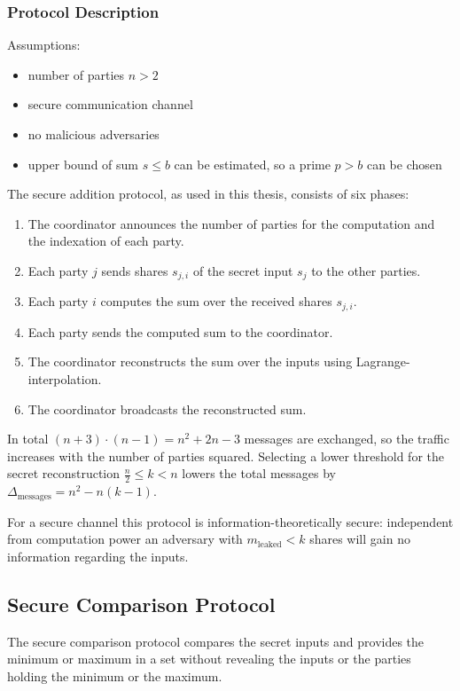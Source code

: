 \subsubsection*{Protocol Description}
Assumptions:
\begin{itemize}
	\item number of parties $n>2$
	\item secure communication channel
	\item no malicious adversaries
	\item upper bound of sum $s \leq b$ can be estimated, so a prime $p > b$ can be chosen 
\end{itemize}
The secure addition protocol, as used in this thesis, consists of six phases:
\begin{enumerate}
	\item The coordinator announces the number of parties for the computation and the indexation of each party.
	\item Each party $j$ sends shares $s_{j,i}$ of the secret input $s_j$ to the other parties.
	\item Each party $i$ computes the sum over the received shares $s_{j,i}$.
	\item Each party sends the computed sum to the coordinator.
	\item The coordinator reconstructs the sum over the inputs using Lagrange-interpolation.
	\item The coordinator broadcasts the reconstructed sum.
\end{enumerate}

In total $(n+3)\cdot (n-1)=n^2+2n-3$ messages are exchanged, so the traffic increases with the number of parties squared. Selecting a lower threshold for the secret reconstruction $\frac{n}{2} \leq k<n$ lowers the total messages by $\Delta_{\text{messages}}=n^2-n(k-1)$.

For a secure channel this protocol is information-theoretically secure: independent from computation power an adversary with $m_\text{leaked}<k$ shares will gain no information regarding the inputs.


\subsection{Secure Comparison Protocol}	\label{Secure Comparison Protocol}
The secure comparison protocol compares the secret inputs and provides the minimum or maximum in a set without revealing the inputs or the parties holding the minimum or the maximum.

